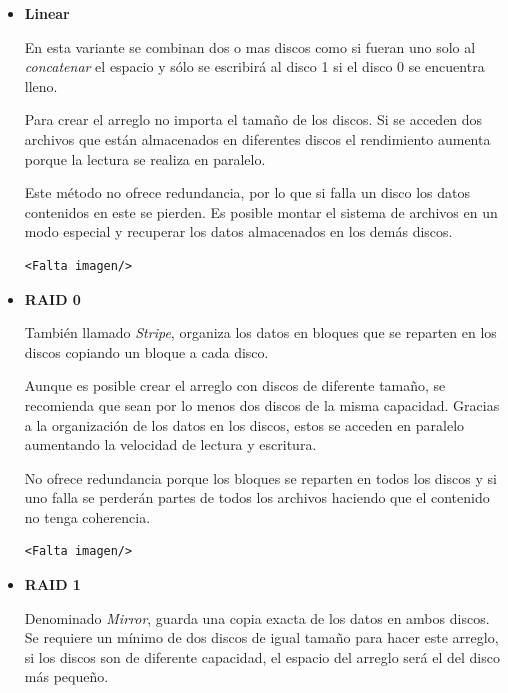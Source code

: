 \begin{itemize}

  \item \textbf{Linear}

En esta variante se combinan dos o mas discos como si fueran uno solo al \emph{concatenar} el espacio y s\'{o}lo se escribir\'{a} al disco 1 si el disco 0 se encuentra lleno.

Para crear el arreglo no importa el tama\~{n}o de los discos. Si se acceden dos archivos que est\'{a}n almacenados en diferentes discos el rendimiento aumenta porque la lectura se realiza en paralelo.

Este m\'{e}todo no ofrece redundancia, por lo que si falla un disco los datos contenidos en este se pierden. Es posible montar el sistema de archivos en un modo especial y recuperar los datos almacenados en los dem\'{a}s discos.

{\large\begin{verbatim}<Falta imagen/>\end{verbatim}}

  \item \textbf{RAID 0}

Tambi\'{e}n llamado \emph{Stripe}, organiza los datos en bloques que se reparten en los discos copiando un bloque a cada disco.

Aunque es posible crear el arreglo con discos de diferente tama\~{n}o, se recomienda que sean por lo menos dos discos de la misma capacidad. Gracias a la organizaci\'{o}n de los datos en los discos, estos se acceden en paralelo aumentando la velocidad de lectura y escritura.

No ofrece redundancia porque los bloques se reparten en todos los discos y si uno falla se perder\'{a}n partes de todos los archivos haciendo que el contenido no tenga coherencia.

{\large\begin{verbatim}<Falta imagen/>\end{verbatim}}

  \item \textbf{RAID 1}
  
Denominado \emph{Mirror}, guarda una copia exacta de los datos en ambos discos. Se requiere un m\'{i}nimo de dos discos de igual tama\~{n}o para hacer este arreglo, si los discos son de diferente capacidad, el espacio del arreglo ser\'{a} el del disco m\'{a}s peque\~{n}o.


\end{itemize}
